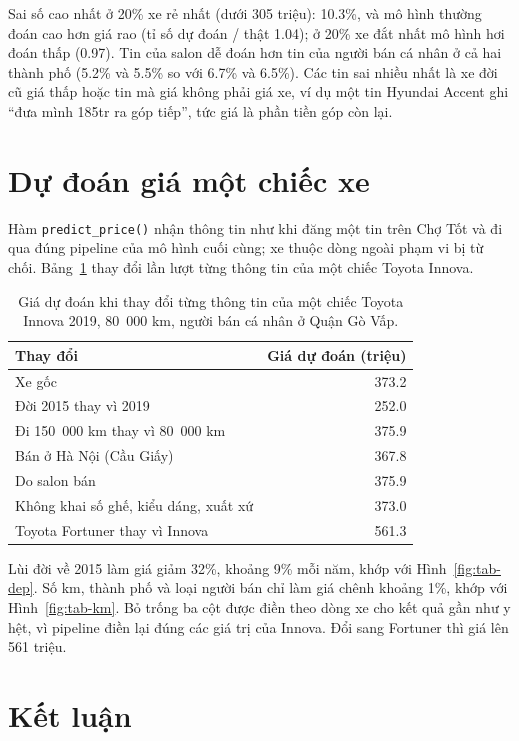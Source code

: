 Sai số cao nhất ở 20\% xe rẻ nhất (dưới 305 triệu): 10.3\%, và mô hình thường đoán cao hơn giá rao (tỉ số dự đoán / thật
1.04); ở 20\% xe đắt nhất mô hình hơi đoán thấp (0.97). Tin của salon dễ đoán hơn tin của người bán cá nhân ở cả hai
thành phố (5.2\% và 5.5\% so với 6.7\% và 6.5\%). Các tin sai nhiều nhất là xe đời cũ giá thấp hoặc tin mà giá không
phải giá xe, ví dụ một tin Hyundai Accent ghi ``đưa mình 185tr ra góp tiếp'', tức giá là phần tiền góp còn lại.

\section{Dự đoán giá một chiếc xe}

Hàm \texttt{predict\_price()} nhận thông tin như khi đăng một tin trên Chợ Tốt và đi qua đúng pipeline của mô hình cuối
cùng; xe thuộc dòng ngoài phạm vi bị từ chối. Bảng~\ref{tab:tab-pricing} thay đổi lần lượt từng thông tin của một chiếc
Toyota Innova.

\begin{table}[H]\centering
\caption{Giá dự đoán khi thay đổi từng thông tin của một chiếc Toyota Innova 2019, 80~000 km, người bán cá nhân ở Quận
Gò Vấp.}\label{tab:tab-pricing}
\begin{tabular}{lr}
\toprule
Thay đổi & Giá dự đoán (triệu) \\
\midrule
Xe gốc & 373.2 \\
Đời 2015 thay vì 2019 & 252.0 \\
Đi 150~000 km thay vì 80~000 km & 375.9 \\
Bán ở Hà Nội (Cầu Giấy) & 367.8 \\
Do salon bán & 375.9 \\
Không khai số ghế, kiểu dáng, xuất xứ & 373.0 \\
Toyota Fortuner thay vì Innova & 561.3 \\
\bottomrule
\end{tabular}
\end{table}

Lùi đời về 2015 làm giá giảm 32\%, khoảng 9\% mỗi năm, khớp với Hình~\ref{fig:tab-dep}. Số km, thành phố và loại người
bán chỉ làm giá chênh khoảng 1\%, khớp với Hình~\ref{fig:tab-km}. Bỏ trống ba cột được điền theo dòng xe cho kết quả gần
như y hệt, vì pipeline điền lại đúng các giá trị của Innova. Đổi sang Fortuner thì giá lên 561 triệu.

\section{Kết luận}

